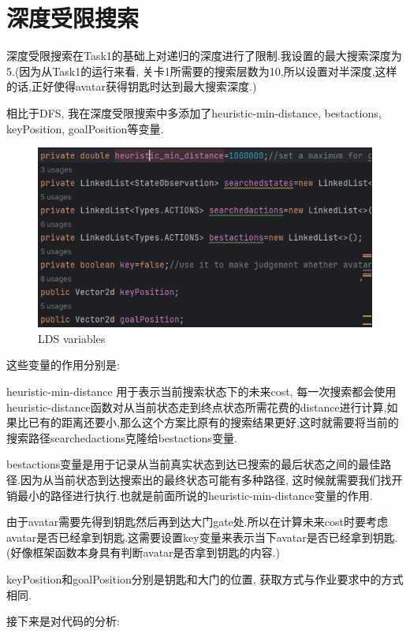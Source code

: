 \documentclass{article}
\begin{document}
\section{深度受限搜索}
深度受限搜索在Task1的基础上对递归的深度进行了限制.我设置的最大搜索深度为5.(因为从Task1的运行来看, 关卡1所需要的搜索层数为10,所以设置对半深度,这样的话,正好使得avatar获得钥匙时达到最大搜索深度.)

相比于DFS, 我在深度受限搜索中多添加了heuristic-min-distance, bestactions, keyPosition, goalPosition等变量.
\begin{figure}[h]
\centering
\includegraphics[width=0.6\linewidth]{LDS-variables}
\caption{LDS variables}
\end{figure}

这些变量的作用分别是:

 heuristic-min-distance 用于表示当前搜索状态下的未来cost, 每一次搜索都会使用heuristic-distance函数对从当前状态走到终点状态所需花费的distance进行计算,如果比已有的距离还要小,那么这个方案比原有的搜索结果更好,这时就需要将当前的搜索路径searchedactions克隆给bestactions变量.

 bestactions变量是用于记录从当前真实状态到达已搜索的最后状态之间的最佳路径.因为从当前状态到达搜索出的最终状态可能有多种路径, 这时候就需要我们找开销最小的路径进行执行.也就是前面所说的heuristic-min-distance变量的作用.

 由于avatar需要先得到钥匙然后再到达大门gate处.所以在计算未来cost时要考虑avatar是否已经拿到钥匙.这需要设置key变量来表示当下avatar是否已经拿到钥匙.(好像框架函数本身具有判断avatar是否拿到钥匙的内容.)

 keyPosition和goalPosition分别是钥匙和大门的位置, 获取方式与作业要求中的方式相同.

接下来是对代码的分析:
\end{document}
